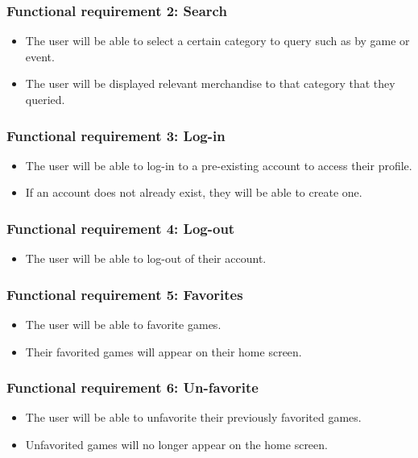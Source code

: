 \documentclass[onecolumn, draftclsnofoot,10pt, compsoc]{IEEEtran}
\begin{document}
\subsubsection{Functional requirement 2: Search}
\begin{itemize}
\item The user will be able to select a certain category to query such as by game or event.
\item The user will be displayed relevant merchandise to that category that they queried.
\end{itemize}

\subsubsection{Functional requirement 3: Log-in}
\begin{itemize}
\item The user will be able to log-in to a pre-existing account to access their profile.
\item If an account does not already exist, they will be able to create one.
\end{itemize}

\subsubsection{Functional requirement 4: Log-out}
\begin{itemize}
\item The user will be able to log-out of their account.
\end{itemize}

\subsubsection{Functional requirement 5: Favorites}
\begin{itemize}
\item The user will be able to favorite games.
\item Their favorited games will appear on their home screen.
\end{itemize}

\subsubsection{Functional requirement 6: Un-favorite}
\begin{itemize}
\item The user will be able to unfavorite their previously favorited games.
\item Unfavorited games will no longer appear on the home screen.
\end{itemize}
\end{document}
